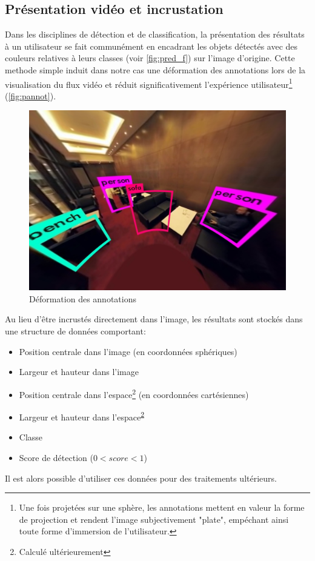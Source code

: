 		\subsection{Présentation vidéo et incrustation}
		
		Dans les disciplines de détection et de classification, la présentation des résultats à un utilisateur se fait communément en encadrant les objets détectés avec des couleurs relatives à leurs classes (voir \autoref{fig:pred_f}) sur l'image d'origine. Cette methode simple induit dans notre cas une déformation des annotations lors de la visualisation du flux vidéo et réduit significativement l'expérience utilisateur\footnote{Une fois projetées sur une sphère, les annotations mettent en valeur la forme de projection et rendent l'image subjectivement "plate", empéchant ainsi toute forme d'immersion de l'utilisateur.} (\autoref{fig:pannot}).
		\begin{figure}[H]
		{
			\centering
			\includegraphics[width=.8\textwidth]{figures/pannot.png}
			\caption{Déformation des annotations}
			\label{fig:pannot}
		}
		\end{figure}
		Au lieu d'être incrustés directement dans l'image, les résultats sont stockés dans une structure de données comportant:
		\begin{itemize}[noitemsep]
			\item Position centrale dans l'image (en coordonnées sphériques)
			\item Largeur et hauteur dans l'image
			\item Position centrale dans l'espace\footnote{\label{ft_calc} Calculé ultérieurement} (en coordonnées cartésiennes)
			\item Largeur et hauteur dans l'espace\textsuperscript{\ref{ft_calc}}
			\item Classe
			\item Score de détection ($ 0 < score < 1 $)
		\end{itemize}
		Il est alors possible d'utiliser ces données pour des traitements ultérieurs.
		\par
		
